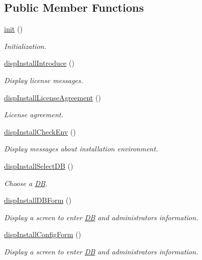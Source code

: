 \subsection*{Public Member Functions}
\begin{DoxyCompactItemize}
\item 
\hyperlink{classinstallView_ab24b18fa10e0268846ac0002d77ee453}{init} ()
\begin{DoxyCompactList}\small\item\em Initialization. \end{DoxyCompactList}\item 
\hyperlink{classinstallView_a811e5c499d36055efb16411c0f0946c1}{disp\+Install\+Introduce} ()
\begin{DoxyCompactList}\small\item\em Display license messages. \end{DoxyCompactList}\item 
\hyperlink{classinstallView_a7182430aaf7f9fb4c8e18d21e9e5a4e7}{disp\+Install\+License\+Agreement} ()
\begin{DoxyCompactList}\small\item\em License agreement. \end{DoxyCompactList}\item 
\hyperlink{classinstallView_ac73107933a9a9498aaef04380137794d}{disp\+Install\+Check\+Env} ()
\begin{DoxyCompactList}\small\item\em Display messages about installation environment. \end{DoxyCompactList}\item 
\hyperlink{classinstallView_aa3ee9747353f128111f628a5c9359c5f}{disp\+Install\+Select\+D\+B} ()
\begin{DoxyCompactList}\small\item\em Choose a \hyperlink{classDB}{D\+B}. \end{DoxyCompactList}\item 
\hyperlink{classinstallView_a61a05991e6aa8bf2278b9c438b70c8c7}{disp\+Install\+D\+B\+Form} ()
\begin{DoxyCompactList}\small\item\em Display a screen to enter \hyperlink{classDB}{D\+B} and administrator\textquotesingle{}s information. \end{DoxyCompactList}\item 
\hyperlink{classinstallView_ad61c851960b71aad3b93cfd1a23149fb}{disp\+Install\+Config\+Form} ()
\begin{DoxyCompactList}\small\item\em Display a screen to enter \hyperlink{classDB}{D\+B} and administrator\textquotesingle{}s information. \end{DoxyCompactList}\item 

\end{DoxyCompactItemize}
